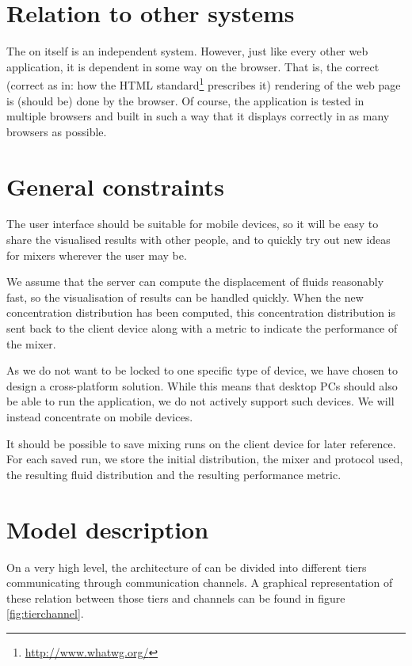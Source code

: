 \section{Relation to other systems}
\label{sec:othersys}
The \applicationname{} on itself is an independent system. However, just like every other web application, it is dependent in some way on the browser. That is, the correct (correct as in: how the HTML standard\footnote{\url{http://www.whatwg.org/}} prescribes it) rendering of the web page is (should be) done by the browser. Of course, the application is tested in multiple browsers and built in such a way that it displays correctly in as many browsers as possible.

\section{General constraints}
\label{sec:genconst}
The user interface should be suitable for mobile devices, so it will be easy to share the visualised results with other people, and to quickly try out new ideas for mixers wherever the user may be.

We assume that the server can compute the displacement of fluids reasonably fast, so the visualisation of results can be handled quickly. When the new concentration distribution has been computed, this concentration distribution is sent back to the client device along with a metric to indicate the performance of the mixer.

As we do not want to be locked to one specific type of device, we have chosen to design a cross-platform solution. While this means that desktop PCs should also be able to run the application, we do not actively support such devices. We will instead concentrate on mobile devices.

It should be possible to save mixing runs on the client device for later reference. For each saved run, we store the initial distribution, the mixer and protocol
used, the resulting fluid distribution and the resulting performance metric.

\section{Model description}
On a very high level, the architecture of \applicationname can be divided into different tiers communicating through communication channels. A graphical representation of these relation between those tiers and channels can be found in figure \ref{fig:tierchannel}.

